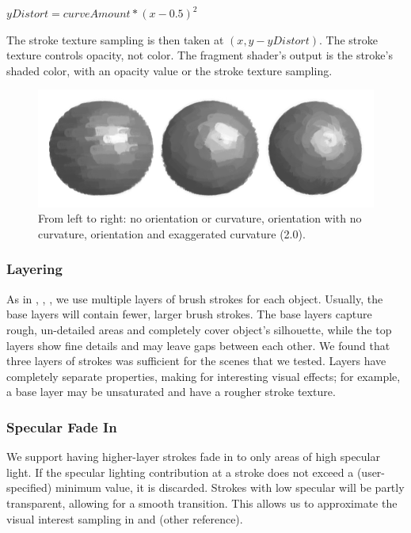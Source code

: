 \documentclass[conference]{acmsiggraph}
\begin{document}
$yDistort = curveAmount * (x - 0.5)^2$

The stroke texture sampling is then taken at $(x, y - yDistort)$. The stroke
texture controls opacity, not color. The fragment shader's output is the
stroke's shaded color, with an opacity value or the stroke texture sampling.


\begin{figure}[ht]
  \centering
  \includegraphics[width=6.0in]{images/sphere_rotation_curve}
  \caption{From left to right: no orientation or curvature, orientation with
           no curvature, orientation and exaggerated curvature (2.0).}
\end{figure}


\subsubsection{Layering}

As in \cite{Hertzmann:1998:PRC:280814.280951},
\cite{Meier:1996:PRA:237170.237288}, \cite{Lu:2010:IPS:1730804.1730825}, we use
multiple layers of brush strokes for each object. Usually, the base layers will
contain fewer, larger brush strokes. The base layers capture rough, un-detailed
areas and completely cover object's silhouette, while the top layers show fine
details and may leave gaps between each other. We found that three layers of
strokes was sufficient for the scenes that we tested. Layers have completely
separate properties, making for interesting visual effects; for example, a base
layer may be unsaturated and have a rougher stroke texture.

\subsubsection{Specular Fade In}

We support having higher-layer strokes fade in to only areas of high specular
light. If the specular lighting contribution at a stroke does not exceed a
(user-specified) minimum value, it is discarded. Strokes with low specular will
be partly transparent, allowing for a smooth transition. This allows us to
approximate the visual interest sampling in
\cite{Hertzmann:1998:PRC:280814.280951} and (other reference).
\end{document}
